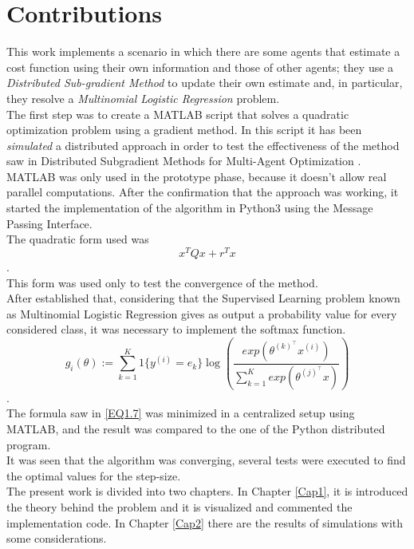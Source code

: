 \documentclass[a4paper,11pt,oneside]{book}
\begin{document}
\section*{Contributions}
This work implements a scenario in which there are some agents that estimate a cost function using their own information and those of other agents; they use a \textit{Distributed Sub-gradient Method} to update their own estimate and, in particular, they resolve a \textit{Multinomial Logistic Regression} problem.\\

The first step was to create a MATLAB script that solves a quadratic optimization problem using a gradient method. In this script it has been \textit{simulated} a distributed approach in order to test the effectiveness of the method saw in Distributed Subgradient Methods for Multi-Agent Optimization \cite{CITATION:1}. MATLAB was only used in the prototype phase, because it doesn't allow real parallel computations. After the confirmation that the approach was working, it started the implementation of the algorithm in Python3 using the Message Passing Interface.\\
The quadratic form used was 
\begin{equation} \tag{I}
x^{T}Qx + r^{T}x
\end{equation}. \\
This form was used only to test the convergence of the method.\\
After established that, considering that the Supervised Learning problem known as Multinomial Logistic Regression gives as output a probability value for every considered class, it was necessary to implement the softmax function. 
\begin{equation} \tag{II}
g_i\left(\theta\right):=\sum_{k=1}^{K}{1\{y^{(i)}=e_k\}\log{\left( \frac{exp(\theta^{(k)^\top}x^{(i)})}{\sum_{k=1}^{K}{exp( \theta^{(j)^\top}x )}} \right)}}
\end{equation} \cite{CITATION:3}. \\
The formula saw in \ref{EQ1.7} was minimized in a centralized setup using MATLAB, and the result was compared to the one of the Python distributed program.\\
It was seen that the algorithm was converging, several tests were executed to find the optimal values for the step-size.\\
The present work is divided into two chapters. In Chapter \ref{Cap1}, it is introduced the theory behind the problem and it is visualized and commented the implementation code. In Chapter \ref{Cap2} there are the results of simulations with some considerations.
\end{document}

